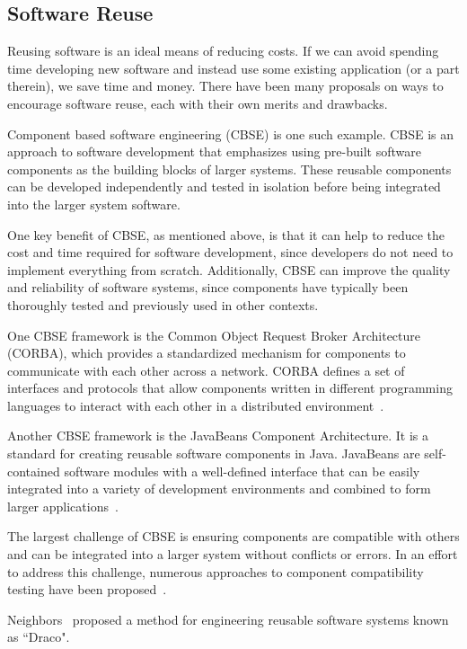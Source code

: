 \subsection{Software Reuse}

Reusing software is an ideal means of reducing costs. If we can avoid spending 
time developing new software and instead use some existing application (or a 
part therein), we save time and money. There have been many proposals on ways 
to encourage software reuse, each with their own merits and drawbacks.

Component based software engineering (CBSE) is one such example. CBSE is an 
approach to software development that emphasizes using pre-built software 
components as the building blocks of larger systems. These reusable components 
can be developed independently and tested in isolation before being integrated 
into the larger system software.

One key benefit of CBSE, as mentioned above, is that it can help to reduce the 
cost and time required for software development, since developers do not need 
to implement everything from scratch. Additionally, CBSE can improve the 
quality and reliability of software systems, since components have typically 
been thoroughly tested and previously used in other contexts.

One CBSE framework is the Common Object Request Broker Architecture (CORBA), 
which provides a standardized mechanism for components to 
communicate with each other across a network. CORBA defines a set of interfaces 
and protocols that allow components written in different programming languages 
to interact with each other in a distributed environment~\cite{OMG2000}.

Another CBSE framework is the JavaBeans Component Architecture. It is a 
standard for creating reusable software components in Java. JavaBeans are 
self-contained software modules with a well-defined interface that can be 
easily integrated into a variety of development environments and combined to 
form larger applications~\cite{OracleJavaBeans}.

The largest challenge of CBSE is ensuring components are compatible with others 
and can be integrated into a larger system without conflicts or errors. In an 
effort to address this challenge, numerous approaches to component 
compatibility testing have been proposed~\cite{Wu2001}.

Neighbors~\cite{Neighbors1980, Neighbors1984,Neighbors1989} proposed a method 
for engineering reusable software systems known as ``Draco".  

